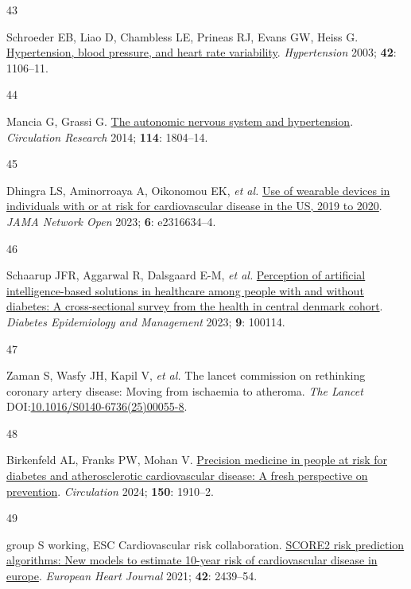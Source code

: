 \documentclass[
  a4paper,
  headsepline=true,
  open=any]{scrbook}
\newlength{\cslhangindent}
\newlength{\csllabelwidth}
\newlength{\cslentryspacingunit} %
\newenvironment{CSLReferences}[2] %
 {%
  \setlength{\parindent}{0pt}
  \ifodd #1
  \let\oldpar\par
  \def\par{\hangindent=\cslhangindent\oldpar}
  \fi
  \setlength{\parskip}{#2\cslentryspacingunit}
 }%
 {}
\newcommand{\CSLLeftMargin}[1]{\parbox[t]{\csllabelwidth}{#1}}
\newcommand{\CSLRightInline}[1]{\parbox[t]{\linewidth - \csllabelwidth}{#1}\break}
\begin{document}
\begin{CSLReferences}{0}{0}
\leavevmode{}%
\CSLLeftMargin{43 }%
\CSLRightInline{Schroeder EB, Liao D, Chambless LE, Prineas RJ, Evans
GW, Heiss G.
\href{https://doi.org/doi:10.1161/01.HYP.0000100444.71069.73}{Hypertension,
blood pressure, and heart rate variability}. \emph{Hypertension} 2003;
\textbf{42}: 1106--11.}

\leavevmode{}%
\CSLLeftMargin{44 }%
\CSLRightInline{Mancia G, Grassi G.
\href{https://doi.org/10.1161/CIRCRESAHA.114.302524}{The autonomic
nervous system and hypertension}. \emph{Circulation Research} 2014;
\textbf{114}: 1804--14.}

\leavevmode{}%
\CSLLeftMargin{45 }%
\CSLRightInline{Dhingra LS, Aminorroaya A, Oikonomou EK, \emph{et al.}
\href{https://doi.org/10.1001/jamanetworkopen.2023.16634}{Use of
wearable devices in individuals with or at risk for cardiovascular
disease in the US, 2019 to 2020}. \emph{JAMA Network Open} 2023;
\textbf{6}: e2316634--4.}

\leavevmode{}%
\CSLLeftMargin{46 }%
\CSLRightInline{Schaarup JFR, Aggarwal R, Dalsgaard E-M, \emph{et al.}
\href{https://doi.org/10.1016/j.deman.2022.100114}{Perception of
artificial intelligence-based solutions in healthcare among people with
and without diabetes: A cross-sectional survey from the health in
central denmark cohort}. \emph{Diabetes Epidemiology and Management}
2023; \textbf{9}: 100114.}

\leavevmode{}%
\CSLLeftMargin{47 }%
\CSLRightInline{Zaman S, Wasfy JH, Kapil V, \emph{et al.} The lancet
commission on rethinking coronary artery disease: Moving from ischaemia
to atheroma. \emph{The Lancet}
DOI:\href{https://doi.org/10.1016/S0140-6736(25)00055-8}{10.1016/S0140-6736(25)00055-8}.}

\leavevmode{}%
\CSLLeftMargin{48 }%
\CSLRightInline{Birkenfeld AL, Franks PW, Mohan V.
\href{https://doi.org/10.1161/CIRCULATIONAHA.124.070463}{Precision
medicine in people at risk for diabetes and atherosclerotic
cardiovascular disease: A fresh perspective on prevention}.
\emph{Circulation} 2024; \textbf{150}: 1910--2.}

\leavevmode{}%
\CSLLeftMargin{49 }%
\CSLRightInline{group S working, ESC Cardiovascular risk collaboration.
\href{https://doi.org/10.1093/eurheartj/ehab309}{SCORE2 risk prediction
algorithms: New models to estimate 10-year risk of cardiovascular
disease in europe}. \emph{European Heart Journal} 2021; \textbf{42}:
2439--54.}


\end{CSLReferences}
\end{document}
